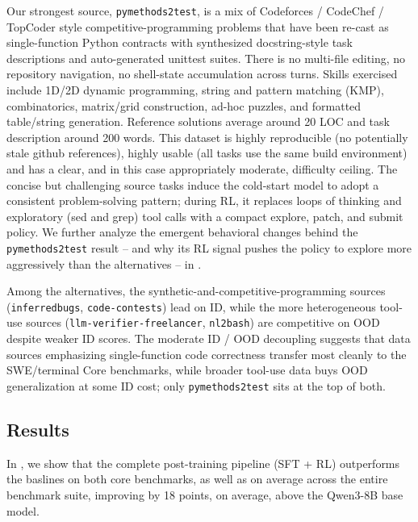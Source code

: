 \documentclass{llmxive}
\begin{document}
Our strongest source, \texttt{pymethods2test}, is a mix of Codeforces / CodeChef / TopCoder style competitive-programming problems that have been re-cast as single-function Python contracts with synthesized docstring-style task descriptions and auto-generated unittest suites. There is no multi-file editing, no repository navigation, no shell-state accumulation across turns. Skills exercised include 1D/2D dynamic
programming, string and pattern matching (KMP), combinatorics, matrix/grid construction, ad-hoc puzzles, and formatted table/string generation. Reference solutions average around 20 LOC and task description around 200 words. This dataset is highly reproducible (no potentially stale github references), highly usable (all tasks use the same build environment) and has a clear, and in this case appropriately moderate, difficulty ceiling. The concise but challenging source tasks induce the cold-start model to adopt a consistent problem-solving pattern; during RL, it replaces loops of thinking and exploratory (sed and grep) tool calls with a compact explore, patch, and submit policy. We further analyze the emergent behavioral changes behind the \texttt{pymethods2test} result -- and why its RL signal pushes the policy to explore more aggressively than the alternatives -- in . 

Among the alternatives, the synthetic-and-competitive-programming sources (\texttt{inferredbugs}, \texttt{code-contests}) lead on ID, while the more heterogeneous tool-use sources (\texttt{llm-verifier-freelancer}, \texttt{nl2bash}) are competitive on OOD despite weaker ID scores. The moderate ID / OOD decoupling suggests that data sources emphasizing single-function code correctness transfer most cleanly to the SWE/terminal Core benchmarks, while broader tool-use data buys OOD generalization at some ID cost; only \texttt{pymethods2test} sits at the top of both.

\subsection{Results}
\label{sec:rl-results}



In , we show that the complete post-training pipeline (SFT + RL) outperforms the baslines on both core benchmarks, as well as on average across the entire benchmark suite, improving by 18 points, on average, above the Qwen3-8B base model. 
\end{document}
